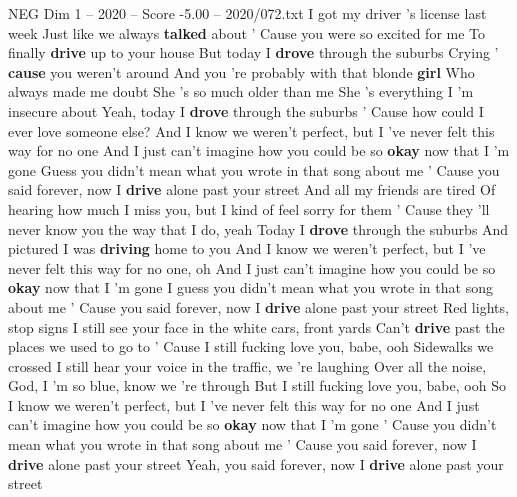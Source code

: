 \begin{textsample}{NEG Dim 1 – 2020 – Score -5.00 – 2020/072.txt}  \label{ex:f1_neg_040}
I got my driver 's license last week Just like we always \textbf{talked} about ' Cause you were so excited for me To finally \textbf{drive} up to your house But today I \textbf{drove} through the suburbs Crying ' \textbf{cause} you weren't around And you 're probably with that blonde \textbf{girl} Who always made me doubt She 's so much older than me She 's everything I 'm insecure about Yeah, today I \textbf{drove} through the suburbs ' Cause how could I ever love someone else?
And I know we weren't perfect, but I 've never felt this way for no one And I just can't imagine how you could be so \textbf{okay} now that I 'm gone Guess you didn't mean what you wrote in that song about me ' Cause you said forever, now I \textbf{drive} alone past your street And all my friends are tired Of hearing how much I miss you, but I kind of feel sorry for them ' Cause they 'll never know you the way that I do, yeah Today I \textbf{drove} through the suburbs And pictured I was \textbf{driving} home to you And I know we weren't perfect, but I 've never felt this way for no one, oh And I just can't imagine how you could be so \textbf{okay} now that I 'm gone I guess you didn't mean what you wrote in that song about me ' Cause you said forever, now I \textbf{drive} alone past your street Red lights, stop signs I still see your face in the white cars, front yards Can't \textbf{drive} past the places we used to go to ' Cause I still fucking love you, babe, ooh Sidewalks we crossed I still hear your voice in the traffic, we 're laughing Over all the noise, God, I 'm so blue, know we 're through But I still fucking love you, babe, ooh So I know we weren't perfect, but I 've never felt this way for no one And I just can't imagine how you could be so \textbf{okay} now that I 'm gone ' Cause you didn't mean what you wrote in that song about me ' Cause you said forever, now I \textbf{drive} alone past your street Yeah, you said forever, now I \textbf{drive} alone past your street

\end{textsample}
